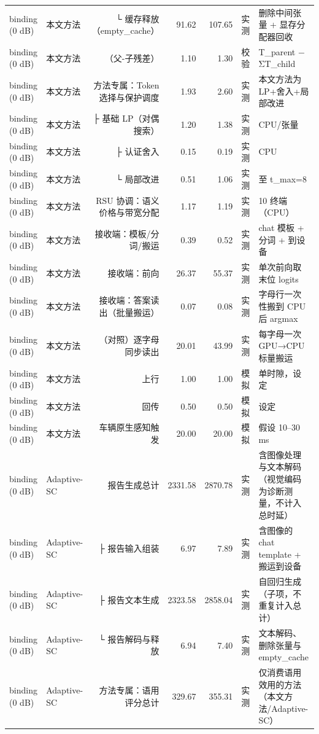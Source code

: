\begin{tabular}{llrrrl}
binding (0 dB) & 本文方法 & └ 缓存释放（empty_cache） & 91.62 & 107.65 & 实测 & 删除中间张量 + 显存分配器回收\\
binding (0 dB) & 本文方法 & （父-子残差） & 1.10 & 1.30 & 校验 & T_parent − ΣT_child\\
binding (0 dB) & 本文方法 & 方法专属：Token 选择与保护调度 & 1.93 & 2.60 & 实测 & 本文方法为 LP+舍入+局部改进\\
binding (0 dB) & 本文方法 & ├ 基础 LP（对偶搜索） & 1.20 & 1.38 & 实测 & CPU/张量\\
binding (0 dB) & 本文方法 & ├ 认证舍入 & 0.15 & 0.19 & 实测 & CPU\\
binding (0 dB) & 本文方法 & └ 局部改进 & 0.51 & 1.06 & 实测 & 至 t_max=8\\
binding (0 dB) & 本文方法 & RSU 协调：语义价格与带宽分配 & 1.17 & 1.19 & 实测 & 10 终端（CPU）\\
binding (0 dB) & 本文方法 & 接收端：模板/分词/搬运 & 0.39 & 0.52 & 实测 & chat 模板 + 分词 + 到设备\\
binding (0 dB) & 本文方法 & 接收端：前向 & 26.37 & 55.37 & 实测 & 单次前向取末位 logits\\
binding (0 dB) & 本文方法 & 接收端：答案读出（批量搬运） & 0.07 & 0.08 & 实测 & 字母行一次性搬到 CPU 后 argmax\\
binding (0 dB) & 本文方法 & （对照）逐字母同步读出 & 20.01 & 43.99 & 实测 & 每字母一次 GPU→CPU 标量搬运\\
binding (0 dB) & 本文方法 & 上行 & 1.00 & 1.00 & 模拟 & 单时隙，设定\\
binding (0 dB) & 本文方法 & 回传 & 0.50 & 0.50 & 模拟 & 设定\\
binding (0 dB) & 本文方法 & 车辆原生感知触发 & 20.00 & 20.00 & 模拟 & 假设 10–30 ms\\
binding (0 dB) & Adaptive-SC & 报告生成总计 & 2331.58 & 2870.78 & 实测 & 含图像处理与文本解码（视觉编码为诊断测量，不计入总时延）\\
binding (0 dB) & Adaptive-SC & ├ 报告输入组装 & 6.97 & 7.89 & 实测 & 含图像的 chat template + 搬运到设备\\
binding (0 dB) & Adaptive-SC & ├ 报告文本生成 & 2323.58 & 2858.04 & 实测 & 自回归生成（子项，不重复计入总计）\\
binding (0 dB) & Adaptive-SC & └ 报告解码与释放 & 6.94 & 7.40 & 实测 & 文本解码、删除张量与 empty_cache\\
binding (0 dB) & Adaptive-SC & 方法专属：语用评分总计 & 329.67 & 355.31 & 实测 & 仅消费语用效用的方法（本文方法/Adaptive-SC）\\

\end{tabular}

